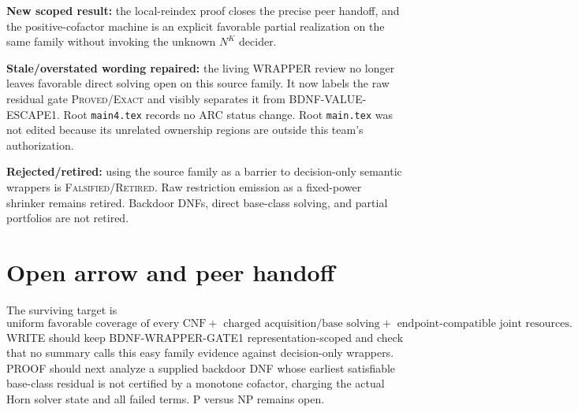 \documentclass[11pt]{article}
\begin{document}
\textbf{New scoped result:} the local-reindex proof closes the precise peer
handoff, and the positive-cofactor machine is an explicit favorable partial
realization on the same family without invoking the unknown $N^K$ decider.

\textbf{Stale/overstated wording repaired:} the living WRAPPER review no
longer leaves favorable direct solving open on this source family.  It now
labels the raw residual gate \textsc{Proved/Exact} and visibly separates it
from BDNF-VALUE-ESCAPE1.  Root \texttt{main4.tex} records no ARC status
change.  Root \texttt{main.tex} was not edited because its unrelated
ownership regions are outside this team's authorization.

\textbf{Rejected/retired:} using the source family as a barrier to
decision-only semantic wrappers is \textsc{Falsified/Retired}.  Raw
restriction emission as a fixed-power shrinker remains retired.  Backdoor
DNFs, direct base-class solving, and partial portfolios are not retired.

\section{Open arrow and peer handoff}
The surviving target is
\[
 \boxed{\text{uniform favorable coverage of every CNF}
 +\text{ charged acquisition/base solving}
 +\text{ endpoint-compatible joint resources}.}
\]
WRITE should keep BDNF-WRAPPER-GATE1 representation-scoped and check that no
summary calls this easy family evidence against decision-only wrappers.
PROOF should next analyze a supplied backdoor DNF whose earliest satisfiable
base-class residual is not certified by a monotone cofactor, charging the
actual Horn solver state and all failed terms.  P versus NP remains open.



\end{document}
